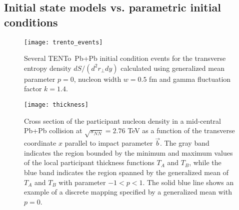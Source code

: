 \documentclass[aps,prc,reprint,amsmath]{revtex4-1}
\newcommand{\trento}{T\raisebox{-0.5ex}{R}ENTo}
\newcommand{\sqrts}{\sqrt{s_{NN}}}
\begin{document}


\subsection{Initial state models vs. parametric initial conditions}
\label{ic}

\begin{figure}
    \texttt{[image: trento\_events]}
    \caption{Several \protect\trento\ Pb+Pb initial condition events for the transverse entropy density $dS/(d^2r_\perp dy)$ calculated using generalized mean parameter $p=0$, nucleon width $w=0.5$ fm and gamma fluctuation factor $k=1.4$.}
\end{figure}

\begin{figure}[b]
    \texttt{[image: thickness]}
    \caption{Cross section of the participant nucleon density in a mid-central Pb+Pb collision at $\sqrts=2.76$ TeV as a function of the transverse coordinate $x$ parallel to impact parameter $\vec{b}$. The gray band indicates the region bounded by the minimum and maximum values of the local participant thickness functions $T_A$ and $T_B$, while the blue band indicates the region spanned by the generalized mean of $T_A$ and $T_B$ with parameter $-1<p<1$. The solid blue line shows an example of a discrete mapping specified by a generalized mean with $p=0$.} 
\end{figure}
\end{document}
